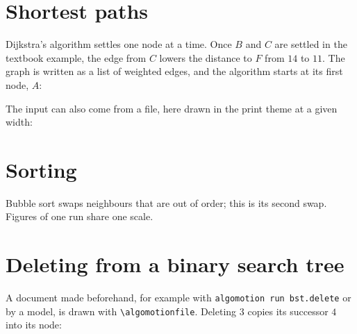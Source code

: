 \documentclass[11pt]{article}
\begin{document}
\section*{Shortest paths}

Dijkstra's algorithm settles one node at a time. Once $B$ and $C$ are
settled in the textbook example, the edge from $C$ lowers the distance
to $F$ from $14$ to $11$. The graph is written as a list of weighted
edges, and the algorithm starts at its first node, $A$:

\begin{center}
\end{center}

The input can also come from a file, here drawn in the print theme at a
given width:

\begin{center}
\end{center}

\section*{Sorting}

Bubble sort swaps neighbours that are out of order; this is its second
swap. Figures of one run share one scale.

\begin{center}
  \par\medskip
\end{center}

\section*{Deleting from a binary search tree}

A document made beforehand, for example with
\texttt{algomotion run bst.delete} or by a model, is drawn with
\verb|\algomotionfile|. Deleting $3$ copies its successor $4$ into its node:

\begin{center}
\end{center}
\end{document}
